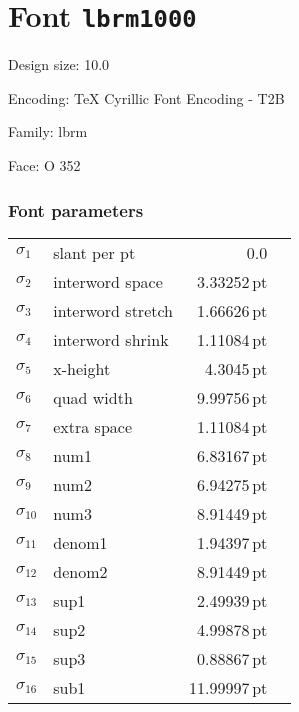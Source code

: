 \documentclass{article}
\newlength{\maxcharwidth}
\begin{document}
\setlength{\maxcharwidth}{81.64918pt}
\addtolength{\maxcharwidth}{2\fboxsep}

\section{Font \texttt{lbrm1000}}


Design size: 10.0\,

Encoding: TeX Cyrillic Font Encoding - T2B

Family: lbrm

Face: O 352

\subsubsection{Font parameters}

\begin{tabular}{@{}llr@{\quad}l}
$\sigma_1$ & slant per pt & 0.0 \\
$\sigma_2$ & interword space & 3.33252\,pt \\
$\sigma_3$ & interword stretch & 1.66626\,pt \\
$\sigma_4$ & interword shrink & 1.11084\,pt \\
$\sigma_5$ & x-height & 4.3045\,pt \\
$\sigma_6$ & quad width & 9.99756\,pt \\
$\sigma_7$ & extra space & 1.11084\,pt \\
$\sigma_8$ & num1 & 6.83167\,pt \\
$\sigma_9$ & num2 & 6.94275\,pt \\
$\sigma_{10}$ & num3 & 8.91449\,pt \\
$\sigma_{11}$ & denom1 & 1.94397\,pt \\
$\sigma_{12}$ & denom2 & 8.91449\,pt \\
$\sigma_{13}$ & sup1 & 2.49939\,pt \\
$\sigma_{14}$ & sup2 & 4.99878\,pt \\
$\sigma_{15}$ & sup3 & 0.88867\,pt \\
$\sigma_{16}$ & sub1 & 11.99997\,pt \\
\end{tabular}
\end{document}
